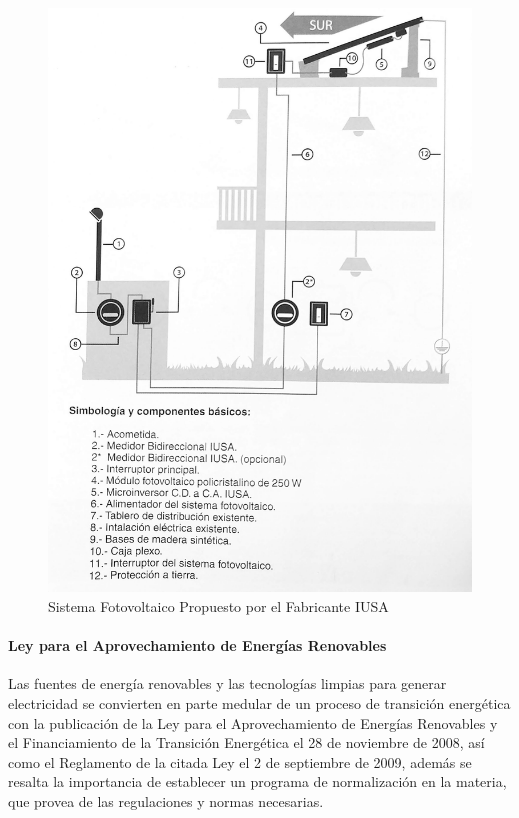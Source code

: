 \begin{figure}[H]
	\centering
	\includegraphics[scale=.1]{Capitulo2/images/sistema-fotovoltaico.jpg}
	\caption{Sistema Fotovoltaico Propuesto por el Fabricante IUSA}
	\label{fig:diagrama_dispensador}
\end{figure}

\paragraph{Ley para el Aprovechamiento de Energías Renovables}
Las fuentes de energía renovables y las tecnologías limpias para generar electricidad se convierten en parte medular de un proceso de transición energética con la publicación de la
Ley para el Aprovechamiento de Energías Renovables y el Financiamiento de la Transición
Energética el 28 de noviembre de 2008, así como el Reglamento de la citada Ley el 2 de septiembre de 2009, además se resalta la importancia de establecer un programa de normalización en la
materia, que provea de las regulaciones y normas necesarias.
\citep{LeyAprovechamiento}


